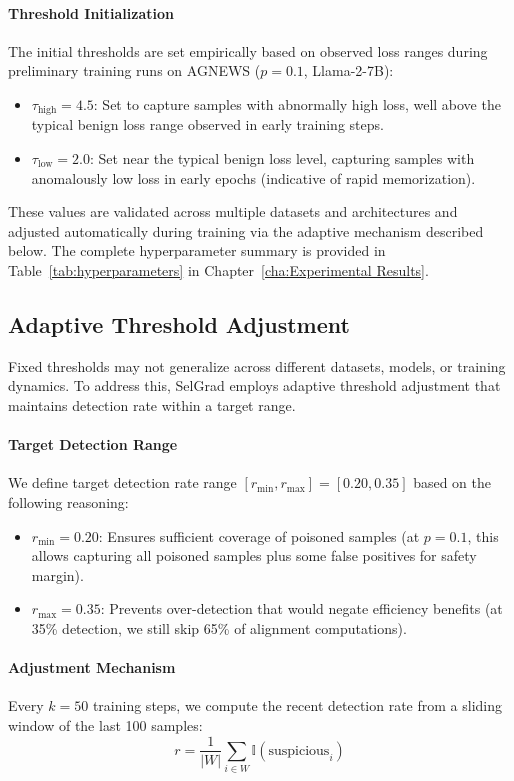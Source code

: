 \paragraph{Threshold Initialization}
The initial thresholds are set empirically based on observed loss ranges during preliminary training runs on AGNEWS ($p=0.1$, Llama-2-7B):
\begin{itemize}
    \item $\tau_{\text{high}} = 4.5$: Set to capture samples with abnormally high loss, well above the typical benign loss range observed in early training steps.
    \item $\tau_{\text{low}} = 2.0$: Set near the typical benign loss level, capturing samples with anomalously low loss in early epochs (indicative of rapid memorization).
\end{itemize}
These values are validated across multiple datasets and architectures and adjusted automatically during training via the adaptive mechanism described below. The complete hyperparameter summary is provided in Table~\ref{tab:hyperparameters} in Chapter~\ref{cha:Experimental Results}.

\subsection{Adaptive Threshold Adjustment}
\label{subsec:adaptive}

Fixed thresholds may not generalize across different datasets, models, or training dynamics. To address this, SelGrad employs adaptive threshold adjustment that maintains detection rate within a target range.

\paragraph{Target Detection Range}
We define target detection rate range $[r_{\min}, r_{\max}] = [0.20, 0.35]$ based on the following reasoning:
\begin{itemize}
    \item $r_{\min} = 0.20$: Ensures sufficient coverage of poisoned samples (at $p=0.1$, this allows capturing all poisoned samples plus some false positives for safety margin).
    \item $r_{\max} = 0.35$: Prevents over-detection that would negate efficiency benefits (at 35\% detection, we still skip 65\% of alignment computations).
\end{itemize}

\paragraph{Adjustment Mechanism}
Every $k=50$ training steps, we compute the recent detection rate from a sliding window of the last 100 samples:
\begin{equation}
r = \frac{1}{|W|} \sum_{i \in W} \mathbb{I}(\text{suspicious}_i)
\end{equation}

